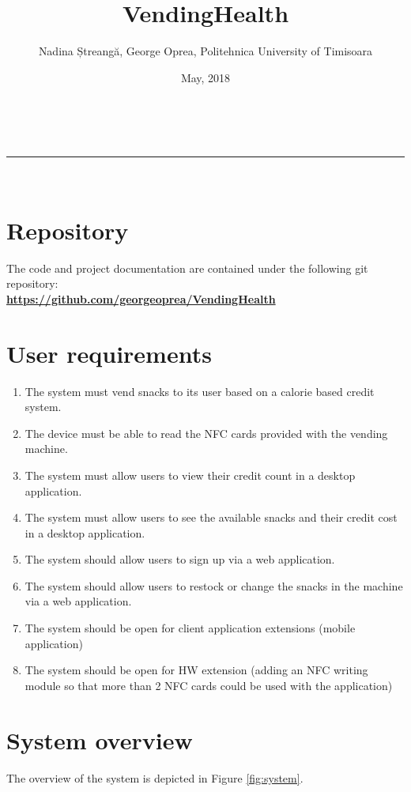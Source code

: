 \documentclass[a4paper,11pt]{article}
\makeatletter
\newcommand{\divider}{\rule{\linewidth}{0.5pt}}
\renewcommand{\maketitle}{
\begin{center}
\vspace{2ex}
{\huge \textsc{\@title}}
\vspace{1ex}
\\
\divider\\
\@author \hfill \@date
\vspace{4ex}
\end{center}
}
\makeatother
\begin{document}
\title{VendingHealth}

\author{Nadina Ștreangă, George Oprea, Politehnica University of Timisoara}

\date{May, 2018}

\maketitle

\section{Repository}
The code and project documentation are contained under the following git repository:\\
\textbf{\url{https://github.com/georgeoprea/VendingHealth}}

\section{User requirements}

\begin{enumerate}
\item The system must vend snacks to its user based on a calorie based credit system.
\item The device must be able to read the NFC cards provided with the vending machine.
\item The system must allow users to view their credit count in a desktop application.
\item The system must allow users to see the available snacks and their credit cost in a 
desktop application.
\item The system should allow users to sign up via a web application.
\item The system should allow users to restock or change the snacks in the machine 
via a web application.
\item The system should be open for client application extensions (mobile application)
\item The system should be open for HW extension (adding an NFC writing module
so that more than 2 NFC cards could be used with the application)
\end{enumerate}

\section{System overview}
The overview of the system is depicted in Figure \ref{fig:system}.\\
\end{document}
